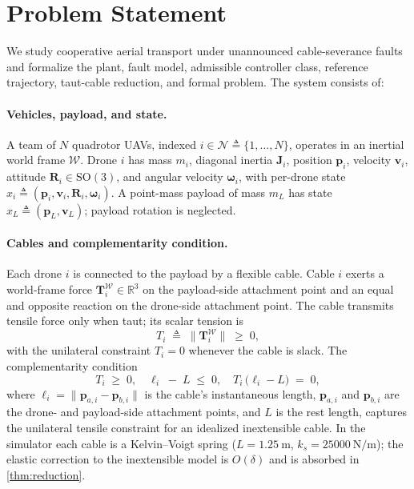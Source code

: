 \documentclass[lettersize,journal]{IEEEtran}
\newcommand{\SOthree}{\mathrm{SO}(3)}
\newcommand{\R}{\mathbb{R}}
\newcommand{\vect}[1]{\boldsymbol{#1}}
\newcommand{\mat}[1]{\boldsymbol{#1}}
\begin{document}
\section{Problem Statement}
\label{sec:ProblemStatement}
\label{sec:Problem_Statement}

We study cooperative aerial transport under unannounced cable-severance faults and formalize the plant, fault model, admissible controller class, reference trajectory, taut-cable reduction, and formal problem. The system consists of:

\paragraph{Vehicles, payload, and state.} A team of $N$ quadrotor UAVs, indexed $i\in\mathcal{N}\triangleq\{1,\dots,N\}$, operates in an inertial world frame $\mathcal{W}$. Drone $i$ has mass $m_i$, diagonal inertia $\mat J_i$, position $\vect p_i$, velocity $\vect v_i$, attitude $\mat R_i\in\SOthree$, and angular velocity $\vect\omega_i$, with per-drone state $x_i\triangleq(\vect p_i,\vect v_i,\mat R_i,\vect\omega_i)$. A point-mass payload of mass $m_L$ has state $x_L\triangleq(\vect p_L,\vect v_L)$; payload rotation is neglected.

\paragraph{Cables and complementarity condition.} Each drone $i$ is connected to the payload by a flexible cable. Cable $i$ exerts a world-frame force $\vect T_i^{\mathcal{W}} \in \R^3$ on the payload-side attachment point and an equal and opposite reaction on the drone-side attachment point. The cable transmits tensile force only when taut; its scalar tension is
\begin{equation}
 T_i \;\triangleq\; \bigl\|\vect T_i^{\mathcal{W}}\bigr\|
     \;\ge\; 0,
  \label{eq:tension-def}
\end{equation}
with the unilateral constraint $T_i = 0$ whenever the cable is slack. The complementarity condition
\begin{equation}
 T_i \;\ge\; 0, \quad
  \ell_i \;-\; L \;\le\; 0, \quad
 T_i\,\bigl(\ell_i - L\bigr) \;=\; 0,
  \label{eq:complementarity}
\end{equation}
where $\ell_i = \|\vect p_{a, i} - \vect p_{b, i}\|$ is the cable's instantaneous length, $\vect p_{a, i}$ and $\vect p_{b, i}$ are the drone- and payload-side attachment points, and $L$ is the rest length, captures the unilateral tensile constraint for an idealized inextensible cable. In the simulator each cable is a Kelvin--Voigt spring ($L = \SI{1.25}{\metre}$, $k_s = \SI{25000}{\newton\per\metre}$); the elastic correction to the inextensible model is $O(\delta)$ and is absorbed in \cref{thm:reduction}.
\end{document}
